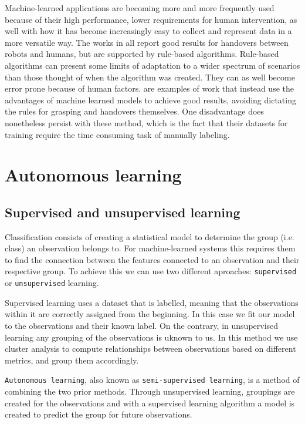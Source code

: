 Machine-learned applications are becoming more and more frequently used because of their high performance, lower requirements for human intervention, as well with how it has become increasingly easy to collect and represent data in a more versatile way. The works in \parencite{Aleotti2012} \parencite{Suay2015} \parencite{Kim2004} all report good results for handovers between robots and humans, but are supported by rule-based algorithms. Rule-based algorithms can present some limits of adaptation to a wider spectrum of scenarios than those thought of when the algorithm was created. They can as well become error prone because of human factors. \parencite{Redmon2014} \parencite{Lenz2015} \parencite{Jiang2011} \parencite{Huebner2008a} are examples of work that instead use the advantages of machine learned models to achieve good results, avoiding dictating the rules for grasping and handovers themselves. One disadvantage does nonetheless persist with these method, which is the fact that their datasets for training require the time consuming task of manually labeling.


\section{Autonomous learning}


\subsection{Supervised and unsupervised learning}

Classification consists of creating a statistical model to determine the group (i.e. class) an observation belongs to. For machine-learned systems this requires them to find the connection between the features connected to an observation and their respective group. To achieve this we can use two different aproaches: \texttt{supervised} or \texttt{unsupervised} learning.

Supervised learning uses a dataset that is labelled, meaning that the observations within it are correctly assigned from the beginning. In this case we fit our model to the observations and their known label. On the contrary, in unsupervised learning any grouping of the observations is uknown to us. In this method we use cluster analysis to compute relationships between observations based on different metrics, and group them accordingly.

\texttt{Autonomous learning}, also known as \texttt{semi-supervised learning}, is a method of combining the two prior methods. Through unsupervised learning, groupings are created for the observations and with a supervised learning algorithm a model is created to predict the group for future observations.


